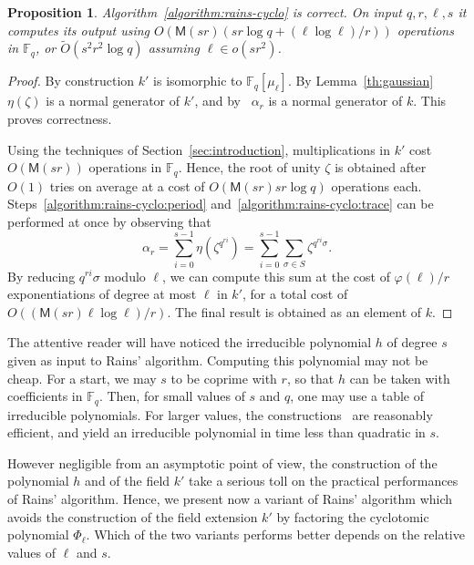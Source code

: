 \documentclass[12pt]{article}
\theoremstyle{plain}
\newtheorem{proposition}[theorem]{Proposition}
\theoremstyle{definition}
\newcommand{\tildO}{\tilde{O}}
\def\F{\ensuremath{\mathbb{F}}}
\def\MM{\ensuremath{\mathsf{M}}}
\def\euler{\ensuremath{\varphi}}
\newcounter{algorithm}
\begin{document}
\begin{proposition}
  Algorithm~\ref{algorithm:rains-cyclo} is correct. On input
  $q,r,\ell,s$ it computes its output using
  $O(\MM(sr)(sr\log q + (\ell\log\ell)/r))$ operations in $\F_q$, or
  $\tildO(s^2r^2\log q)$ assuming $\ell\in o(sr^2)$.
\end{proposition}
\begin{proof}
  By construction $k'$ is isomorphic to $\F_q[\mu_\ell]$. By
  Lemma~\ref{th:gaussian} $\eta(\zeta)$ is a normal generator of $k'$,
  and by~\cite[Prop.~5.2.3.1]{mullen2013handbook} $\alpha_r$ is a
  normal generator of $k$. This proves correctness.

  Using the techniques of Section~\ref{sec:introduction},
  multiplications in $k'$ cost $O(\MM(sr))$ operations in $\F_q$.
  Hence, the root of unity $\zeta$ is obtained after $O(1)$ tries on
  average at a cost of $O(\MM(sr)sr\log q)$ operations each.
  Steps~\ref{algorithm:rains-cyclo:period}
  and~\ref{algorithm:rains-cyclo:trace} can be performed at once by
  observing that
  \[\alpha_r = \sum_{i=0}^{s-1}\eta(\zeta^{q^{ri}})= \sum_{i=0}^{s-1}\sum_{\sigma\in S}\zeta^{q^{ri}\sigma}.\]
  By reducing $q^{ri}\sigma$ modulo $\ell$, we can compute this sum at
  the cost of $\euler(\ell)/r$ exponentiations of degree at most
  $\ell$ in $k'$, for a total cost of
  $O((\MM(sr)\ell\log\ell)/r)$. The final result is obtained as an
  element of $k$.
\end{proof}

The attentive reader will have noticed the irreducible polynomial $h$
of degree $s$ given as input to Rains' algorithm. Computing this
polynomial may not be cheap. For a start, we may $s$ to be coprime
with $r$, so that $h$ can be taken with coefficients in $\F_q$. Then,
for small values of $s$ and $q$, one may use a table of irreducible
polynomials. For larger values, the
constructions~\cite{couveignes+lercier11,DeDoSc13,DeFeo:2014:FAA:2608628.2608672}
are reasonably efficient, and yield an irreducible polynomial in time
less than quadratic in $s$.

However negligible from an asymptotic point of view, the construction
of the polynomial $h$ and of the field $k'$ take a serious toll on the
practical performances of Rains' algorithm. Hence, we present now a
variant of Rains' algorithm which avoids the construction of the field
extension $k'$ by factoring the cyclotomic polynomial
$\Phi_\ell$. Which of the two variants performs better depends on the
relative values of $\ell$ and $s$.
\end{document}
